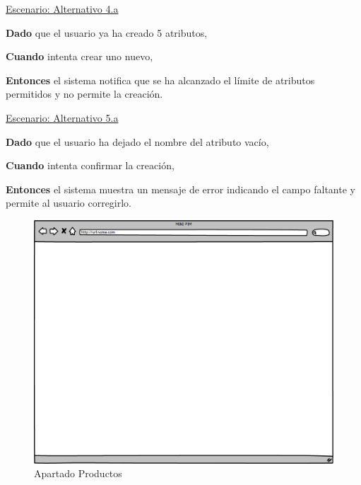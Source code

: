 \underline{Escenario: Alternativo 4.a}\par
\vspace{0.15cm}
\textbf{Dado} que el usuario ya ha creado 5 atributos,\par
\textbf{Cuando} intenta crear uno nuevo,\par
\textbf{Entonces} el sistema notifica que se ha alcanzado el límite de atributos permitidos y no permite la creación.\par
\vspace{0.20cm}

\underline{Escenario: Alternativo 5.a}\par
\vspace{0.15cm}
\textbf{Dado} que el usuario ha dejado el nombre del atributo vacío,\par
\textbf{Cuando} intenta confirmar la creación,\par
\textbf{Entonces} el sistema muestra un mensaje de error indicando el campo faltante y permite al usuario corregirlo.\par
\vspace{0.20cm}


\begin{figure}[H]
    \includegraphics[width=1\linewidth]{mockups/RF6_1Crear Atrbuto.png}
    \caption{Apartado Productos}
   \end{figure}
\vspace{1.0cm}

